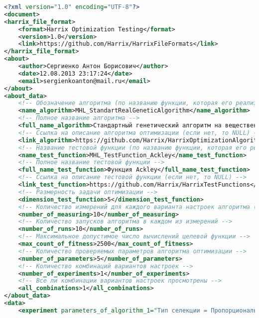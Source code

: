 \documentclass[a4paper,12pt]{article}
\begin{document}
\begin{lstlisting}[label=Example01, language=xml ,caption=Пример части файла Harrix Optimization Testing]
<?xml version="1.0" encoding="UTF-8"?>
<document>
<harrix_file_format>
	<format>Harrix Optimization Testing</format>
	<version>1.0</version>
	<link>https://github.com/Harrix/HarrixFileFormats</link>
</harrix_file_format>
<about>
	<author>Сергиенко Антон Борисович</author>
	<date>12.08.2013 23:17:24</date>
	<email>sergienkoanton@mail.ru</email>
</about>
<about_data>
	<!-- Обозначение алгоритма (по названию функции, которая его реализует) -->
	<name_algorithm>MHL_StandartRealGeneticAlgorithm</name_algorithm>
	<!-- Полное название алгоритма -->
	<full_name_algorithm>Стандартный генетический алгоритм на вещественных строках</full_name_algorithm>
	<!-- Ссылка на описание алгоритма оптимизации (если нет, то NULL) -->
	<link_algorithm>https://github.com/Harrix/HarrixOptimizationAlgorithms</link_algorithm>
	<!-- Название тестовой функции (по названию функции, которая его реализует) -->
	<name_test_function>MHL_TestFunction_Ackley</name_test_function>
	<!-- Полное название тестовой функции -->
	<full_name_test_function>Функция Ackley</full_name_test_function>
	<!-- Ссылка на описание тестовой функции (если нет, то NULL) -->
	<link_test_function>https://github.com/Harrix/HarrixTestFunctions</link_test_function>
	<!-- Размерность задачи оптимизации -->
	<dimension_test_function>5</dimension_test_function>
	<!-- Количество измерений для каждого варианта настроек алгоритма (сколько точек получим) -->
	<number_of_measuring>10</number_of_measuring>
	<!-- Количество запусков алгоритма в каждом из измерений -->
	<number_of_runs>10</number_of_runs>
	<!-- Максимальное допустимое число вычислений целевой функции -->
	<max_count_of_fitness>2500</max_count_of_fitness>
	<!-- Количество проверяемых параметров алгоритма оптимизации -->
	<number_of_parameters>5</number_of_parameters>
	<!-- Количество комбинаций вариантов настроек -->
	<number_of_experiments>1</number_of_experiments>
	<!-- Все ли комбинации вариантов настроек просмотрены -->
	<all_combinations>1</all_combinations>
</about_data>
<data>
	<experiment parameters_of_algorithm_1="Тип селекции = Пропорциональная селекция" parameters_of_algorithm_2="Тип скрещивания = Одноточечное скрещивание" parameters_of_algorithm_3="Тип мутации = Слабая мутация" parameters_of_algorithm_4="Тип формирования нового поколения = Только потомки" parameters_of_algorithm_5="Тип преобразования задачи вещественной оптимизации в задачу бинарной оптимизации = Стандартное представление целого числа - номер узла в сетке дискретизации">

\end{lstlisting}
\end{document}
